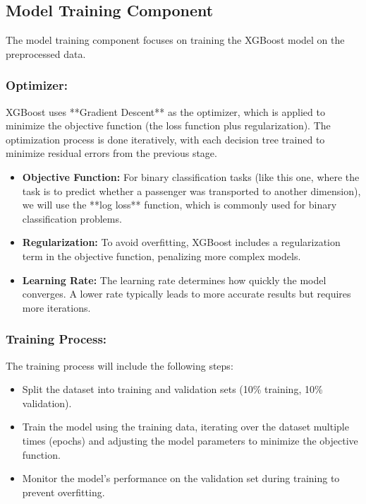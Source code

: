 \documentclass[15pt]{article}
\begin{document}
\subsection{Model Training Component}

The model training component focuses on training the XGBoost model on the preprocessed data.

\subsubsection{Optimizer:}

XGBoost uses **Gradient Descent** as the optimizer, which is applied to minimize the objective function (the loss function plus regularization). The optimization process is done iteratively, with each decision tree trained to minimize residual errors from the previous stage.

\begin{itemize}
    \item \textbf{Objective Function:} For binary classification tasks (like this one, where the task is to predict whether a passenger was transported to another dimension), we will use the **log loss** function, which is commonly used for binary classification problems.
    \item \textbf{Regularization:} To avoid overfitting, XGBoost includes a regularization term in the objective function, penalizing more complex models.
    \item \textbf{Learning Rate:} The learning rate determines how quickly the model converges. A lower rate typically leads to more accurate results but requires more iterations.
\end{itemize}

\subsubsection{Training Process:}

The training process will include the following steps:
\begin{itemize}
    \item Split the dataset into training and validation sets (10\% training, 10\% validation).
    \item Train the model using the training data, iterating over the dataset multiple times (epochs) and adjusting the model parameters to minimize the objective function.
    \item Monitor the model’s performance on the validation set during training to prevent overfitting.
\end{itemize}
\end{document}
